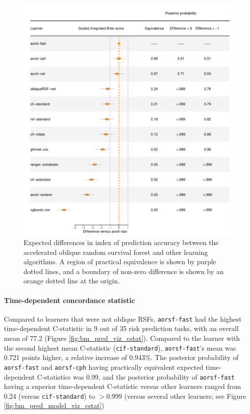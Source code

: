 \documentclass{article}\usepackage[]{graphicx}\usepackage[]{xcolor}
\makeatletter
\def\maxwidth{ %
  \ifdim\Gin@nat@width>\linewidth
    \linewidth
  \else
    \Gin@nat@width
  \fi
}
\newenvironment{knitrout}{}{} %
\makeatother
\begin{document}
\begin{knitrout}
\color{fgcolor}\begin{figure}
\includegraphics[width=\maxwidth]{figure/bm_pred_model_viz_ibs-1} \caption[Expected differences in index of prediction accuracy between the accelerated oblique random survival forest and other learning algorithms]{Expected differences in index of prediction accuracy between the accelerated oblique random survival forest and other learning algorithms. A region of practical equivalence is shown by purple dotted lines, and a boundary of non-zero difference is shown by an orange dotted line at the origin.}\label{fig:bm_pred_model_viz_ibs}
\end{figure}

\end{knitrout}

\paragraph{Time-dependent concordance statistic}




Compared to learners that were not oblique RSFs, \texttt{aorsf-fast} had the highest time-dependent C-statistic in 9 out of 35 risk prediction tasks, with an overall mean of 77.2 (Figure \ref{fig:bm_pred_viz_cstat}). Compared to the learner with the second highest mean C-statistic (\texttt{cif-standard}), \texttt{aorsf-fast}'s mean was 0.721 points higher, a relative increase of 0.943\%. The posterior probability of \texttt{aorsf-fast} and \texttt{aorsf-cph} having practically equivalent expected time-dependent C-statistics was 0.99, and the posterior probability of \texttt{aorsf-fast} having a superior time-dependent C-statistic versus other learners ranged from 0.24 (versus \texttt{cif-standard}) to $>$0.999 (versus several other learners; see Figure \ref{fig:bm_pred_model_viz_cstat})
\end{document}
